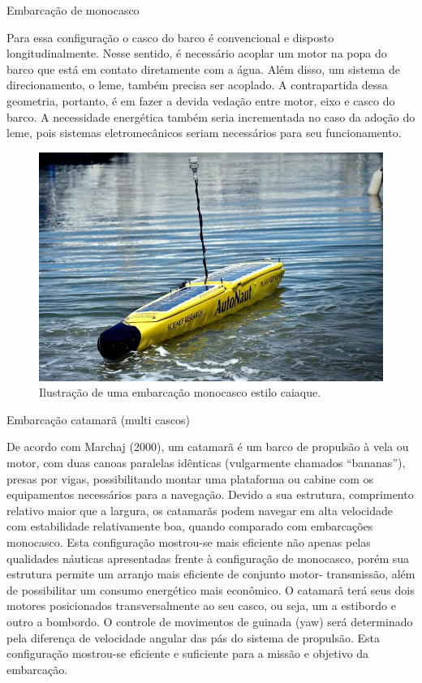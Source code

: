 Embarcação de monocasco

Para essa configuração o casco do barco é convencional e disposto longitudinalmente. Nesse sentido, é necessário acoplar um motor na popa do barco que está em contato diretamente com a água. Além disso, um sistema de direcionamento, o leme, também precisa ser acoplado. A contrapartida dessa geometria, portanto, é em fazer a devida vedação entre motor, eixo e casco do barco. A necessidade energética também seria incrementada no caso da adoção do leme, pois sistemas eletromecânicos seriam necessários para seu funcionamento.

 \begin{figure} [!htp]
	\centering
	\includegraphics[scale=0.6]{figuras/monocasco}
	\caption{Ilustração de uma embarcação monocasco estilo caiaque.}
	\label{monocasco}
\end{figure}
\FloatBarrier


Embarcação catamarã (multi cascos)

De acordo com Marchaj (2000), um catamarã é um barco de propulsão à vela ou motor, com duas canoas paralelas idênticas (vulgarmente chamados “bananas”), presas por vigas, possibilitando montar uma plataforma ou cabine com os equipamentos necessários para a navegação. Devido a sua estrutura, comprimento relativo maior que a largura, os catamarãs podem navegar em alta velocidade com estabilidade relativamente boa, quando comparado com embarcações monocasco.
Esta configuração mostrou-se mais eficiente não apenas pelas qualidades náuticas apresentadas frente à configuração de monocasco, porém sua estrutura permite um arranjo mais eficiente de conjunto motor- transmissão, além de possibilitar um consumo energético mais econômico. 
O catamarã terá seus dois motores posicionados transversalmente ao seu casco, ou seja, um a estibordo e outro a bombordo. O controle de movimentos de guinada (yaw) será determinado pela diferença de velocidade angular das pás do sistema de propulsão. 
Esta configuração mostrou-se eficiente e suficiente para a missão e objetivo da embarcação.



